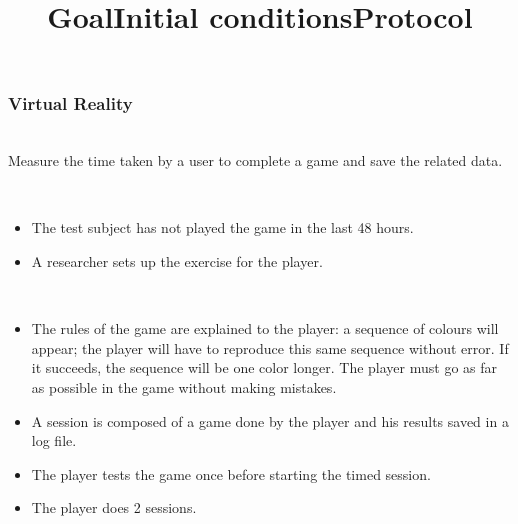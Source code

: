 \documentclass[12pt, openany, twocolumn]{article}
\begin{document}
        \subsubsection{Virtual Reality}
            \title{\textbf{Goal}} \\
            Measure the time taken by a user to complete a game and save the related data. \\
            \title{\textbf{Initial conditions}} \\
                \begin{itemize}
                    \item{The test subject has not played the game in the last 48 hours.} \\
                    \item{A researcher sets up the exercise for the player.} \\
                \end{itemize}
            \title{\textbf{Protocol}} \\
                \begin{itemize}
                    \item{The rules of the game are explained to the player: a sequence of colours will appear; the player will have to reproduce this same sequence without error. If it succeeds, the sequence will be one color longer. The player must go as far as possible in the game without making mistakes.} \\
                    \item{A session is composed of a game done by the player and his results saved in a log file.} \\
                    \item{The player tests the game once before starting the timed session.} \\
                    \item{The player does 2 sessions.} \\
                \end{itemize}
\end{document}
